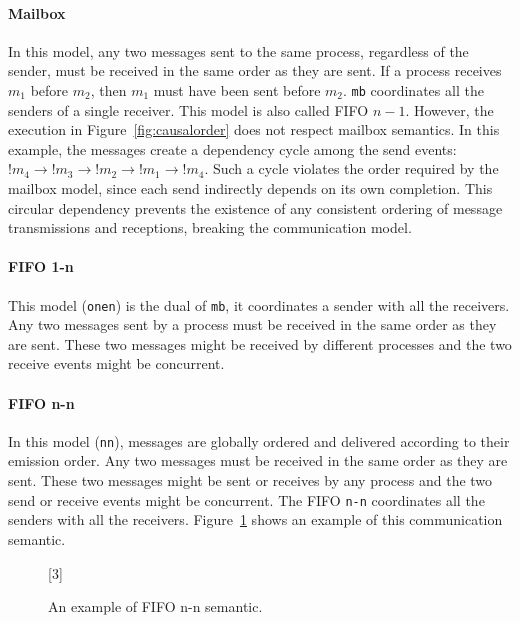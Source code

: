 \paragraph{Mailbox}
In this model, any two messages sent to the same process, regardless of the sender, 
must be received in the same order as they are sent. If a process receives $m_1$ 
before $m_2$, then $m_1$ must have been sent before $m_2$. \verb|mb| coordinates all 
the senders of a single receiver. This model is also called FIFO $n\!-\!1$.
However, the execution in Figure~\ref{fig:causalorder} does not respect mailbox semantics.  
In this example, the messages create a dependency cycle among the send events:  
$!m_4 \rightarrow !m_3 \rightarrow !m_2 \rightarrow !m_1 \rightarrow !m_4$.  
Such a cycle violates the order required by the mailbox model, since each 
send indirectly depends on its own completion. This circular dependency prevents 
the existence of any consistent ordering of message transmissions and receptions, 
breaking the communication model.

\paragraph{FIFO 1-n}
This model (\verb|onen|) is the dual of \verb|mb|, it coordinates a sender with all the 
receivers. Any two messages sent by a process must be received in the same 
order as they are sent. These two messages might be received by different 
processes and the two receive events might be concurrent.

\paragraph{FIFO n-n}
In this model (\verb|nn|), messages are globally ordered and delivered according to 
their emission order. Any two messages must be received in the same order 
as they are sent. These two messages might be sent or receives by any process 
and the two send or receive events might be concurrent. The FIFO \verb|n-n| 
coordinates all the senders with all the receivers. Figure~\ref{fig:finonn}
shows an example of this communication semantic.

\begin{figure}[!ht]
	\centering
	\begin{msc}[draw frame=none, draw head=none, msc keyword=, 
				head height=0px, label distance=0.5ex, 
				foot height=0px, foot distance=0px]{}

		[3]
		\nextlevel
		\nextlevel
	\end{msc}
	\caption{An example of FIFO n-n semantic.}
	\label{fig:finonn}
\end{figure}

